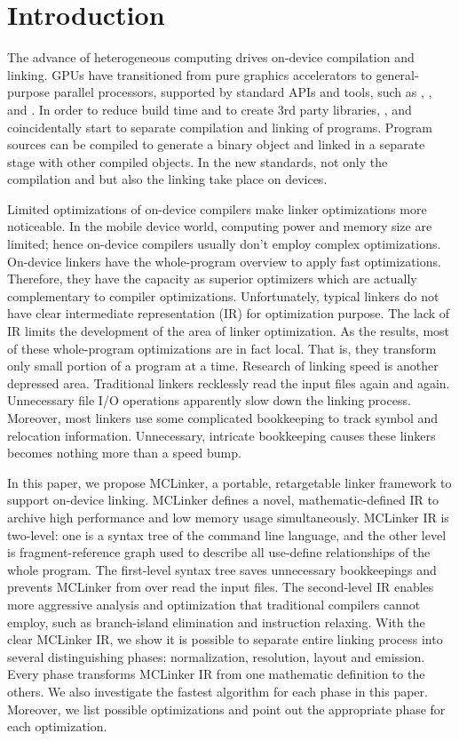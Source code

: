 \section{Introduction}
The advance of heterogeneous computing drives on-device compilation and linking. GPUs have transitioned from pure graphics accelerators to general-purpose parallel processors, supported by standard APIs and tools, such as \cite{CUDA}, \cite{OpenCL}, \cite{DirectCompute} and \cite{HSA}. In order to reduce build time and to create 3rd party libraries, \cite{CUDA}, \cite{OpenCL} and \cite{HSA} coincidentally start to separate compilation and linking of programs. Program sources can be compiled to generate a binary object and linked in a separate stage with other compiled objects. In the new standards, not only the compilation and but also the linking take place on devices.

Limited optimizations of on-device compilers make linker optimizations more noticeable. In the mobile device world, computing power and memory size are limited; hence on-device compilers usually don't employ complex optimizations. On-device linkers have the whole-program overview to apply fast optimizations. Therefore, they have the capacity as superior optimizers which are actually complementary to compiler optimizations. Unfortunately, typical linkers do not have clear intermediate representation (IR) for optimization purpose. The lack of IR limits the development of the area of linker optimization. As the results, most of these whole-program optimizations are in fact local. That is, they transform only small portion of a program at a time. Research of linking speed is another depressed area. Traditional linkers recklessly read the input files again and again. Unnecessary file I/O operations apparently slow down the linking process. Moreover, most linkers use some complicated bookkeeping to track symbol and relocation information. Unnecessary, intricate bookkeeping causes these linkers becomes nothing more than a speed bump.

In this paper, we propose MCLinker, a portable, retargetable linker framework to support on-device linking. MCLinker defines a novel, mathematic-defined IR to archive high performance and low memory usage simultaneously. MCLinker IR is two-level: one is a syntax tree of the command line language, and the other level is fragment-reference graph used to describe all use-define relationships of the whole program. The first-level syntax tree saves unnecessary bookkeepings and prevents MCLinker from over read the input files. The second-level IR enables more aggressive analysis and optimization that traditional compilers cannot employ, such as branch-island elimination and instruction relaxing. With the clear MCLinker IR, we show it is possible to separate entire linking process into several distinguishing phases: normalization, resolution, layout and emission. Every phase transforms MCLinker IR from one mathematic definition to the others. We also investigate the fastest algorithm for each phase in this paper. Moreover, we list possible optimizations and point out the appropriate phase for each optimization.

